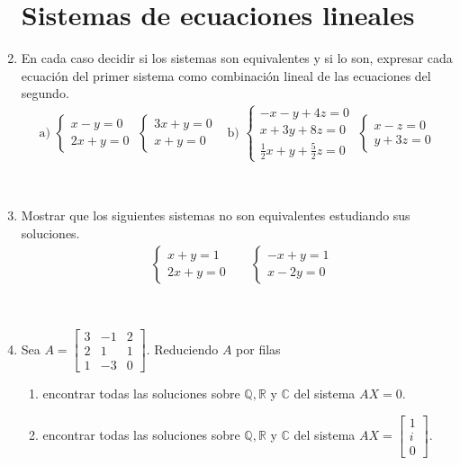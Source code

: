 \documentclass[11pt,spanish,makeidx]{amsbook}
\newcommand\Q{\mathbb{Q}}
\newcommand\R{\mathbb{R}}
\newcommand\C{\mathbb{C}}
\begin{document}
\begin{enumerate}
\section*{Sistemas de ecuaciones lineales}


\item En cada caso decidir si los sistemas son equivalentes y si lo son, expresar cada ecuaci\'on del primer sistema como combinaci\'on lineal de las ecuaciones del segundo.
$$\begin{array}{ll}
   \text{a) } \begin{cases} x-y=0 \\ 2x+y=0 \end{cases} \;
     \begin{cases} 3x+y=0 \\ x+y=0 \end{cases}   &
  \text{b) } \begin{cases} -x-y+4z=0 \\ x+3y+8z=0 \\ \tfrac{1}{2}x+y+\tfrac{5}{2}z=0 \end{cases} \;
    \begin{cases} x-z=0 \\ y+3z=0 \end{cases}
    \end{array}$$

\

\item Mostrar que los siguientes sistemas no son equivalentes estudiando sus soluciones.
\begin{align*}
    &\begin{cases} x+y=1 \\ 2x+y=0 \end{cases} &
    & \begin{cases} -x+y=1 \\ x-2y=0 \end{cases}  
\end{align*}



\

\item Sea $A=\begin{bmatrix}3 & -1 & 2 \\2 & 1 & 1 \\1&-3&0\end{bmatrix}$. Reduciendo $A$ por filas
 \begin{enumerate}
   \item encontrar todas las soluciones sobre $\Q,\R$ y $\C$ del sistema $AX=0$.
   \item encontrar todas las soluciones sobre $\Q,\R$ y $\C$ del sistema $AX=\left[\begin{array}{c}
     1\\i\\0 \end{array}\right]$.
 \end{enumerate}


\end{enumerate}
\end{document}
